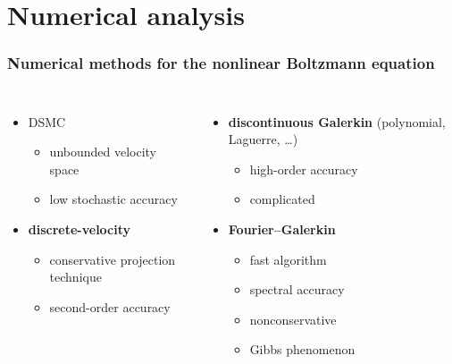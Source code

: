 \documentclass[mathserif]{beamer} %
\newcommand\pro{\item[$+$]}
\newcommand\con{\item[$-$]}
\begin{document}
\section{Numerical analysis}

\begin{frame}
    \frametitle{Numerical methods for the nonlinear Boltzmann equation}
    \begin{columns}
		\begin{itemize}
            \item DSMC
            \begin{itemize}
                \pro unbounded velocity space
                \con low stochastic accuracy
            \end{itemize}
            \vspace{20pt}
            \item \textbf{discrete-velocity}
            \begin{itemize}
                \pro conservative projection technique \newline [Tcheremissine 1998]
                \pro second-order accuracy
            \end{itemize}
        \end{itemize}
		\begin{itemize}
            \item \textbf{discontinuous Galerkin} (polynomial, Laguerre, \dots)
            \begin{itemize}
                \pro high-order accuracy
                \con complicated %
            \end{itemize}
            \vspace{20pt}
            \item \textbf{Fourier--Galerkin}
            \begin{itemize}
                \pro fast algorithm 
                \pro spectral accuracy
                \con nonconservative
                \con Gibbs phenomenon
            \end{itemize}
        \end{itemize}
	\end{columns}
\end{frame}
\end{document}
